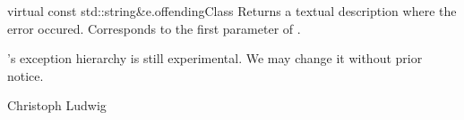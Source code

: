 
\ACCS

\begin{cfcode}{virtual const std::string&}{e.offendingClass}{}
  Returns a textual description where the error occured. Corresponds to the
  first parameter of .
\end{cfcode}



\SEEALSO
{}



\WARNINGS

\LiDIA's exception hierarchy is still experimental. We may change it without
prior notice.


\AUTHOR

Christoph Ludwig


